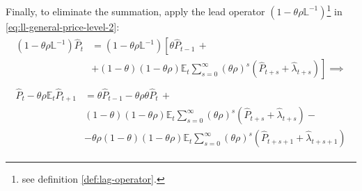 \documentclass[
	12pt,
	]{article}
\numberwithin{equation}{section}
\newcommand{\E}[1][t]{{\mathbb{E}_{#1}}}
\theoremstyle{definition}
\theoremstyle{plain}
\theoremstyle{plain}
\theoremstyle{plain}
\begin{document}
Finally, to eliminate the summation, apply the lead operator $(1- \theta \rho \mathbb{L}^{-1})$\footnote{see definition \ref{def:lag-operator}.} in \ref{eq:ll-general-price-level-2}:
\begin{align}
	\begin{split}
		(1- \theta \rho \mathbb{L}^{-1}) \hat{P}_t &= (1- \theta \rho \mathbb{L}^{-1}) \left[ \theta \hat{P}_{t-1} \, + \right. \\
		&\left. + (1-\theta) (1- \theta \rho) \E \sum_{s=0}^{\infty} \left( \theta \rho \right)^s \left( \hat{P}_{t+s} + \hat{\lambda}_{t+s} \right) \right] \implies \nonumber
	\end{split} \\
	\begin{split}
		\hat{P}_t - \theta \rho \E \hat{P}_{t+1} &= \theta \hat{P}_{t-1} - \theta \rho \theta \hat{P}_t \, + \\
		& (1-\theta) (1- \theta \rho) \E \sum_{s=0}^{\infty} \left( \theta \rho \right)^s \left( \hat{P}_{t+s} + \hat{\lambda}_{t+s} \right) - \\
		& - \theta \rho (1-\theta) (1- \theta \rho) \E \sum_{s=0}^{\infty} \left( \theta \rho \right)^s \left( \hat{P}_{t+s+1} + \hat{\lambda}_{t+s+1} \right)
	\end{split} \label{eq:ll-general-price-level-3}
\end{align}
\end{document}
